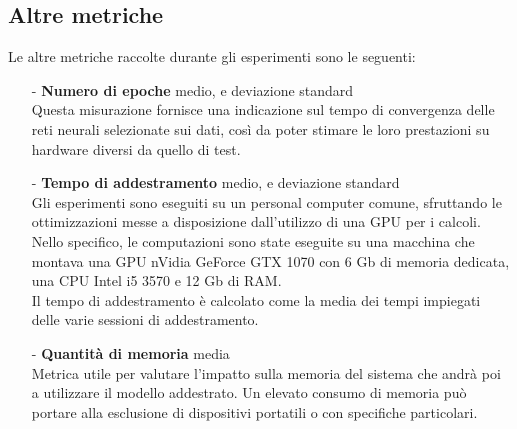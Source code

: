 \subsection{Altre metriche}
Le altre metriche raccolte durante gli esperimenti sono le seguenti:
\begin{itemize}
    \item[-] \textbf{Numero di epoche} medio, e deviazione standard\\
    Questa misurazione fornisce una indicazione sul tempo di convergenza delle reti neurali selezionate sui dati, così da poter stimare le loro prestazioni su hardware diversi da quello di test.
    \item[-] \textbf{Tempo di addestramento} medio, e deviazione standard\\
    Gli esperimenti sono eseguiti su un personal computer comune, sfruttando le ottimizzazioni messe a disposizione dall'utilizzo di una GPU per i calcoli. Nello specifico, le computazioni sono state eseguite su una macchina che montava una GPU nVidia GeForce GTX 1070 con 6 Gb di memoria dedicata, una CPU Intel i5 3570 e 12 Gb di RAM.\\%
    Il tempo di addestramento è calcolato come la media dei tempi impiegati delle varie sessioni di addestramento.
    \item[-] \textbf{Quantità di memoria} media\\
    Metrica utile per valutare l'impatto sulla memoria del sistema che andrà poi a utilizzare il modello addestrato. Un elevato consumo di memoria può portare alla esclusione di dispositivi portatili o con specifiche particolari.
\end{itemize}

